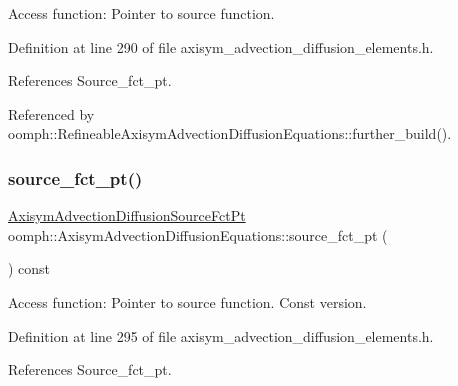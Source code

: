 Access function\+: Pointer to source function. 



Definition at line 290 of file axisym\+\_\+advection\+\_\+diffusion\+\_\+elements.\+h.



References Source\+\_\+fct\+\_\+pt.



Referenced by oomph\+::\+Refineable\+Axisym\+Advection\+Diffusion\+Equations\+::further\+\_\+build().

\mbox{\label{classoomph_1_1AxisymAdvectionDiffusionEquations_a17c388ee58d922f5dc26e8d315aead58}} 
\subsubsection{\texorpdfstring{source\+\_\+fct\+\_\+pt()}{source\_fct\_pt()}\hspace{0.1cm}{\footnotesize\ttfamily [2/2]}}
{\footnotesize\ttfamily \hyperlink{classoomph_1_1AxisymAdvectionDiffusionEquations_a5110527308cbe58e90fb9ac146d172a0}{Axisym\+Advection\+Diffusion\+Source\+Fct\+Pt} oomph\+::\+Axisym\+Advection\+Diffusion\+Equations\+::source\+\_\+fct\+\_\+pt (\begin{DoxyParamCaption}{ }\end{DoxyParamCaption}) const\hspace{0.3cm}{\ttfamily [inline]}}



Access function\+: Pointer to source function. Const version. 



Definition at line 295 of file axisym\+\_\+advection\+\_\+diffusion\+\_\+elements.\+h.



References Source\+\_\+fct\+\_\+pt.

\mbox{\label{classoomph_1_1AxisymAdvectionDiffusionEquations_a5638fd954bd0427e5470646c523fa3ac}} 
